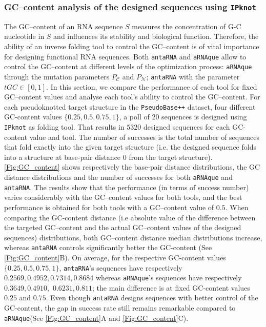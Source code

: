 \subsubsection{GC--content analysis of the designed sequences using \texttt{IPknot}}
The GC--content of an \ac{RNA} sequence $S$ measures the concentration of G-C nucleotide in $S$ and influences its stability and biological function. Therefore, the ability of an inverse folding tool to control the GC--content is of vital importance for designing functional \ac{RNA} sequences. Both \texttt{antaRNA} and \texttt{aRNAque} allow to control the GC--content at different levels of the optimization process: \texttt{aRNAque} through the mutation parameters $P_{\mathcal{C}}$ and $P_{\mathcal{N}}$; \texttt{antaRNA} with the parameter $tGC\in [ 0,1 ]$. In this section, we compare the performance of each tool for fixed GC--content values and analyse each tool's ability to control the GC--content. For each pseudoknotted target structure in the \texttt{PseudoBase++} dataset, four different GC-content values $\{0.25,0.5, 0.75, 1\}$, a poll of $20$ sequences is designed using \texttt{IPknot} as folding tool. That results in $5320$ designed sequences for each GC-content value and tool. The number of successes is the total number of sequences that fold exactly into the given target structure (i.e. the designed sequence folds into a structure at base-pair distance $0$ from the target structure). \autoref{Fig:GC_content} shows respectively the base-pair distance distributions, the GC distance distributions and the number of successes for both \texttt{aRNAque} and \texttt{antaRNA}. The results show that the performance (in terms of success number) varies considerably with the GC--content values for both tools, and the best performance is obtained for both tools with a GC--content value of $0.5$. When comparing the GC-content distance (i.e absolute value of the difference between the targeted GC--content and the actual GC--content values of the designed sequences) distributions, both GC--content distance median distributions increase, whereas \texttt{antaRNA} controls significantly better the GC-content (See \autoref{Fig:GC_content}B). On average, for the respective GC-content values $\{0.25, 0.5, 0.75, 1\}$, \texttt{antaRNA}'s sequences have respectively $0.2569, 0.4952, 0.7314, 0.8684$ whereas  \texttt{aRNAque}'s sequences have respectively $0.3649, 0.4910,$ $ 0.6231, 0.811$; the main difference is at fixed GC-content values $0.25$ and $0.75$. Even though \texttt{antaRNA} designs sequences with better control of the GC-content, the gap in success rate still remains remarkable compared to \texttt{aRNAque}(See \autoref{Fig:GC_content}A and \autoref{Fig:GC_content}C).
